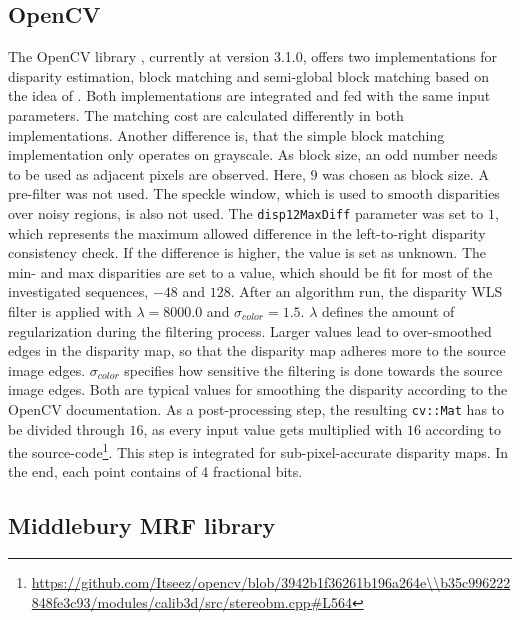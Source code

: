 \subsection*{OpenCV}

The OpenCV library \citep{opencv_library}, currently at version 3.1.0, offers two implementations for disparity estimation, block matching and semi-global block matching based on the idea of \citeauthor{hirschmuller2005accurate}.
Both implementations are integrated and fed with the same input parameters.
The matching cost are calculated differently in both implementations.
Another difference is, that the simple block matching implementation only operates on grayscale.
As block size, an odd number needs to be used as adjacent pixels are observed.
Here, $9$ was chosen as block size.
A pre-filter was not used.
The speckle window, which is used to smooth disparities over noisy regions, is also not used.
The \texttt{disp12MaxDiff} parameter was set to $1$, which represents the maximum allowed difference in the left-to-right disparity consistency check.
If the difference is higher, the value is set as unknown.
The min- and max disparities are set to a value, which should be fit for most of the investigated sequences, $-48$ and $128$.
\newline\newline\noindent After an algorithm run, the disparity WLS filter is applied with $\lambda = 8000.0$ and $\sigma_{color} = 1.5$.
$\lambda$ defines the amount of regularization during the filtering process.
Larger values lead to over-smoothed edges in the disparity map, so that the disparity map adheres more to the source image edges.
$\sigma_{color}$ specifies how sensitive the filtering is done towards the source image edges.
Both are typical values for smoothing the disparity according to the OpenCV documentation.
As a post-processing step, the resulting \texttt{cv::Mat} has to be divided through $16$, as every input value gets multiplied with $16$ according to the source-code\footnote{\url{https://github.com/Itseez/opencv/blob/3942b1f36261b196a264e\\b35c996222848fe3c93/modules/calib3d/src/stereobm.cpp\#L564}}.
This step is integrated for sub-pixel-accurate disparity maps.
In the end, each point contains of 4 fractional bits.

\subsection*{Middlebury MRF library}

